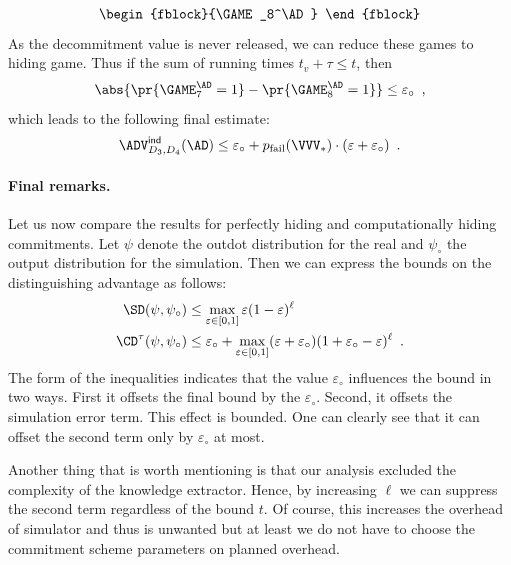 \documentclass{crypto-exercise}
\renewcommand{\ADVIND}[2]{\ADV^{\mathsf{ind}}_{#1}(#2)}
\newcommand{\PFAIL}{p_{\mathrm{fail}}}
\begin{document}
\begin{solution}
\begin{align*}
\begin{fblock}{\GAME_8^\AD}
\end{fblock}
\end{align*}
As the decommitment value is never released, we can reduce these games to hiding game. Thus 
if the sum of running times $t_v+\tau\leq t$, then
\begin{align*}
\abs{\pr{\GAME_7^\AD=1}-\pr{\GAME_8^\AD=1}}\leq \varepsilon_\circ\enspace,
\end{align*}
which leads to the following final estimate:
\begin{align*}
\ADVIND{D_3,D_4}{\AD}\leq \varepsilon_\circ + \PFAIL(\VVV_*)\cdot(\varepsilon+\varepsilon_\circ)\enspace. 
\end{align*}

\paragraph{Final remarks.}
Let us now compare the results for perfectly hiding and computationally hiding commitments. Let $\psi$ denote the outdot distribution for the real and $\psi_\circ$ the output distribution for the simulation. Then we can express the bounds on the distinguishing advantage as follows:
\begin{align*}
\SD(\psi,\psi_\circ)&\leq\max_{\varepsilon\in[0,1]} \varepsilon(1-\varepsilon)^\ell\\
\CD^\tau(\psi,\psi_\circ)&\leq \varepsilon_\circ +\max_{\varepsilon\in[0,1]}(\varepsilon+\varepsilon_\circ)(1+\varepsilon_\circ-\varepsilon)^\ell\enspace.
\end{align*}  
The form of the inequalities indicates that the value $\varepsilon_\circ$ influences the bound in two ways. First it offsets the final bound by the $\varepsilon_\circ$. Second, it offsets the simulation error term. This effect is bounded. One can clearly see that it can offset the second term only by $\varepsilon_\circ$ at most. 

Another thing that is worth mentioning is that our analysis excluded the complexity of the knowledge extractor. Hence, by increasing $\ell$ we can suppress the second term regardless of the bound $t$. Of course, this increases the overhead of simulator and thus is unwanted but at least we do not have to choose the commitment scheme parameters on planned overhead.


\end{solution}
\end{document}
